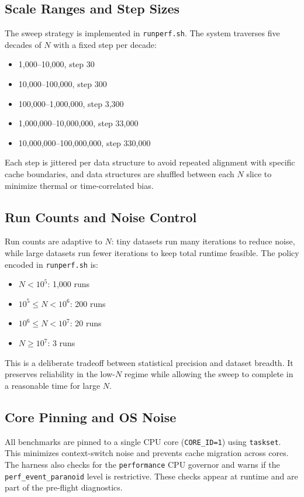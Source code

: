 \documentclass[11pt]{article}
\begin{document}
\subsection{Scale Ranges and Step Sizes}
The sweep strategy is implemented in \texttt{runperf.sh}. The system traverses five decades of \(N\) with a fixed step per decade:
\begin{itemize}
    \item 1,000--10,000, step 30
    \item 10,000--100,000, step 300
    \item 100,000--1,000,000, step 3,300
    \item 1,000,000--10,000,000, step 33,000
    \item 10,000,000--100,000,000, step 330,000
\end{itemize}
Each step is jittered per data structure to avoid repeated alignment with specific cache boundaries, and data structures are shuffled between each \(N\) slice to minimize thermal or time-correlated bias.

\subsection{Run Counts and Noise Control}
Run counts are adaptive to \(N\): tiny datasets run many iterations to reduce noise, while large datasets run fewer iterations to keep total runtime feasible. The policy encoded in \texttt{runperf.sh} is:
\begin{itemize}
    \item \(N < 10^5\): 1,000 runs
    \item \(10^5 \le N < 10^6\): 200 runs
    \item \(10^6 \le N < 10^7\): 20 runs
    \item \(N \ge 10^7\): 3 runs
\end{itemize}
This is a deliberate tradeoff between statistical precision and dataset breadth. It preserves reliability in the low-\(N\) regime while allowing the sweep to complete in a reasonable time for large \(N\).

\subsection{Core Pinning and OS Noise}
All benchmarks are pinned to a single CPU core (\texttt{CORE\_ID=1}) using \texttt{taskset}. This minimizes context-switch noise and prevents cache migration across cores. The harness also checks for the \texttt{performance} CPU governor and warns if the \texttt{perf\_event\_paranoid} level is restrictive. These checks appear at runtime and are part of the pre-flight diagnostics.
\end{document}
